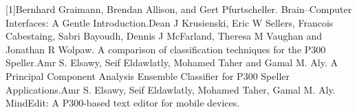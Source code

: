 [1]\quad Bernhard Graimann, Brendan Allison, and Gert Pfurtscheller. Brain–Computer Interfaces: A Gentle Introduction.\newline\newline
[2]\quad Dean J Krusienski, Eric W Sellers, Francois Cabestaing, Sabri Bayoudh, Dennis J McFarland, Theresa M Vaughan and Jonathan R Wolpaw. A comparison of classification techniques for the P300 Speller.\newline\newline
[3]\quad Amr S. Elsawy, Seif Eldawlatly, Mohamed Taher and Gamal M. Aly. A Principal Component Analysis Ensemble Classifier for P300 Speller Applications.\newline\newline
[4]\quad Amr S. Elsawy, Seif Eldawlatly, Mohamed Taher, Gamal M. Aly. MindEdit: A P300-based text editor for mobile devices.